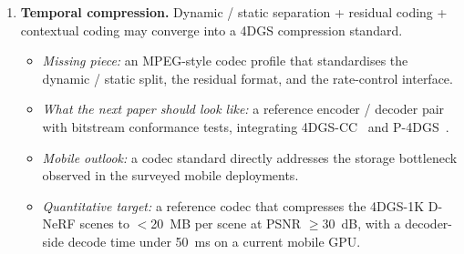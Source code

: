 \begin{enumerate}
  \item \textbf{Temporal compression.} Dynamic / static separation
        + residual coding + contextual coding may converge into a
        4DGS compression standard.
        \begin{itemize}
        \item \textit{Missing piece:} an MPEG-style codec profile
              that standardises the dynamic / static split, the
              residual format, and the rate-control interface.
        \item \textit{What the next paper should look like:} a
              reference encoder / decoder pair with bitstream
              conformance tests, integrating
              4DGS-CC~\cite{chen20254dgscc} and
              P-4DGS~\cite{wang2025p4dgs}.
        \item \textit{Mobile outlook:} a codec standard
              directly addresses the storage bottleneck
              observed in the surveyed mobile deployments.
        \item \textit{Quantitative target:} a reference codec that
              compresses the 4DGS-1K D-NeRF scenes to $<$20~MB
              per scene at PSNR $\ge 30$~dB, with a
              decoder-side decode time under 50~ms on
              a current mobile GPU.
        \end{itemize}


\end{enumerate}
